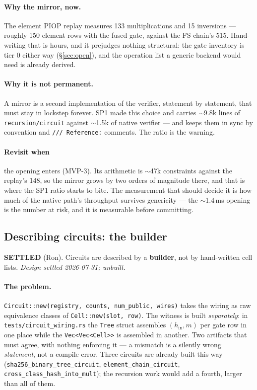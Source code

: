 \documentclass[11pt]{article}
\newcommand{\code}[1]{\texttt{#1}}
\newcommand{\settled}[1]{\medskip\noindent\textbf{SETTLED} (#1).\xspace}
\theoremstyle{definition}
\begin{document}
\paragraph{Why the mirror, now.} The element PIOP replay measures 133
multiplications and 15 inversions --- roughly 150 element rows with the fused
gate, against the FS chain's 515. Hand-writing that is hours, and it prejudges
nothing structural: the gate inventory is tier 0 either way
(\S\ref{sec:open}), and the operation list a generic backend would need is
already derived.

\paragraph{Why it is not permanent.} A mirror is a second implementation of
the verifier, statement by statement, that must stay in lockstep forever. SP1
made this choice and carries $\sim$9.8k lines of \code{recursion/circuit}
against $\sim$1.5k of native verifier --- and keeps them in sync by convention
and \code{/// Reference:} comments. The ratio is the warning.

\paragraph{Revisit when} the opening enters (MVP-3). Its arithmetic is
$\sim$47k constraints against the replay's 148, so the mirror grows by two
orders of magnitude there, and that is where the SP1 ratio starts to bite.
The measurement that should decide it is how much of the native path's
throughput survives genericity --- the $\sim$1.4\,ms opening is the number at
risk, and it is measurable before committing.

\subsection{Describing circuits: the builder}\label{sec:builder}

\settled{Ron} Circuits are described by a \textbf{builder}, not by
hand-written cell lists. \emph{Design settled 2026-07-31; unbuilt.}

\paragraph{The problem.} \code{Circuit::new(registry, counts, num\_public,
wires)} takes the wiring as raw equivalence classes of
\code{Cell::new(slot, row)}. The witness is built \emph{separately}: in
\code{tests/circuit\_wiring.rs} the \code{Tree} struct assembles
$(h_{\mathrm{in}}, m)$ per gate row in one place while the
\code{Vec<Vec<Cell>>} is assembled in another. Two artifacts that must
agree, with nothing enforcing it --- a mismatch is a silently wrong
\emph{statement}, not a compile error. Three circuits are already built this
way (\code{sha256\_binary\_tree\_circuit}, \code{element\_chain\_circuit},
\code{cross\_class\_hash\_into\_mult}); the recursion work would add a
fourth, larger than all of them.
\end{document}
